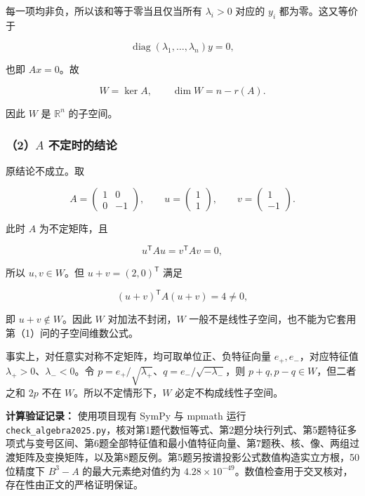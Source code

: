 \documentclass[11pt,fontset=fandol]{ctexart}
\begin{document}
每一项均非负，所以该和等于零当且仅当所有 \(\lambda_i>0\) 对应的 \(y_i\)
都为零。这又等价于

\[
\operatorname{diag}(\lambda_1,\ldots,\lambda_n)y=0,
\]

也即 \(Ax=0\)。故

\[
\boxed{W=\ker A},\qquad
\boxed{\dim W=n-r(A)}.
\]

因此 \(W\) 是 \(\mathbb R^n\) 的子空间。

\subsubsection{\texorpdfstring{（2）\(A\)
不定时的结论}{（2）A 不定时的结论}}\label{a-ux4e0dux5b9aux65f6ux7684ux7ed3ux8bba}

原结论不成立。取

\[
A=\begin{pmatrix}1&0\\0&-1\end{pmatrix},\qquad
u=\begin{pmatrix}1\\1\end{pmatrix},\qquad
v=\begin{pmatrix}1\\-1\end{pmatrix}.
\]

此时 \(A\) 为不定矩阵，且

\[
u^{\mathsf T}Au=v^{\mathsf T}Av=0,
\]

所以 \(u,v\in W\)。但 \(u+v=(2,0)^{\mathsf T}\) 满足

\[
(u+v)^{\mathsf T}A(u+v)=4\ne0,
\]

即 \(u+v\notin W\)。因此 \(W\)
对加法不封闭，\(\boxed{W\text{ 一般不是线性子空间}}\)，也不能为它套用第（1）问的子空间维数公式。

事实上，对任意实对称不定矩阵，均可取单位正、负特征向量
\(e_+,e_-\)，对应特征值 \(\lambda_+>0\)、\(\lambda_-<0\)。令
\(p=e_+/\sqrt{\lambda_+}\)、\(q=e_-/\sqrt{-\lambda_-}\)，则
\(p+q,p-q\in W\)，但二者之和 \(2p\) 不在 \(W\)。所以不定情形下，\(W\)
必定不构成线性子空间。

\textbf{计算验证记录：} 使用项目现有 SymPy 与 mpmath 运行
\texttt{check\_algebra2025.py}，核对第1题代数恒等式、第2题分块行列式、第5题特征多项式与变号区间、第6题全部特征值和最小值特征向量、第7题秩、核、像、两组过渡矩阵及变换矩阵，以及第8题反例。第5题另按谱投影公式数值构造实立方根，50位精度下
\(B^3-A\) 的最大元素绝对值约为
\(4.28\times10^{-49}\)。数值检查用于交叉核对，存在性由正文的严格证明保证。
\end{document}
